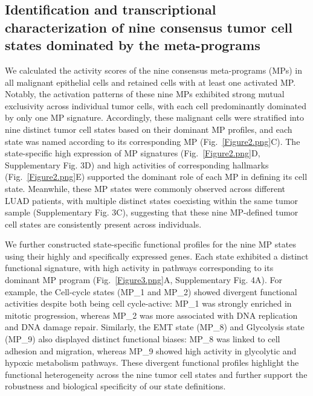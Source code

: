 \documentclass[pdflatex,sn-mathphys-num]{sn-jnl}%
\theoremstyle{thmstyleone}%
\theoremstyle{thmstyletwo}%
\theoremstyle{thmstylethree}%
\begin{document}
\subsection{Identification and transcriptional characterization of nine consensus tumor cell states dominated by the meta-programs}\label{subsec3}

We calculated the activity scores of the nine consensus meta-programs (MPs) in all malignant epithelial cells and retained cells with at least one activated MP. Notably, the activation patterns of these nine MPs exhibited strong mutual exclusivity across individual tumor cells, with each cell predominantly dominated by only one MP signature. Accordingly, these malignant cells were stratified into nine distinct tumor cell states based on their dominant MP profiles, and each state was named according to its corresponding MP (Fig.~\ref{Figure2.png}C). The state-specific high expression of MP signatures (Fig.~\ref{Figure2.png}D, Supplementary Fig. 3D) and high activities of corresponding hallmarks (Fig.~\ref{Figure2.png}E) supported the dominant role of each MP in defining its cell state. Meanwhile, these MP states were commonly observed across different LUAD patients, with multiple distinct states coexisting within the same tumor sample (Supplementary Fig. 3C), suggesting that these nine MP-defined tumor cell states are consistently present across individuals.

We further constructed state-specific functional profiles for the nine MP states using their highly and specifically expressed genes. Each state exhibited a distinct functional signature, with high activity in pathways corresponding to its dominant MP program (Fig.~\ref{Figure3.png}A, Supplementary Fig. 4A). For example, the Cell-cycle states (MP\_1 and MP\_2) showed divergent functional activities despite both being cell cycle-active: MP\_1 was strongly enriched in mitotic progression, whereas MP\_2 was more associated with DNA replication and DNA damage repair. Similarly, the EMT state (MP\_8) and Glycolysis state (MP\_9) also displayed distinct functional biases: MP\_8 was linked to cell adhesion and migration, whereas MP\_9 showed high activity in glycolytic and hypoxic metabolism pathways. These divergent functional profiles highlight the functional heterogeneity across the nine tumor cell states and further support the robustness and biological specificity of our state definitions.
\end{document}
